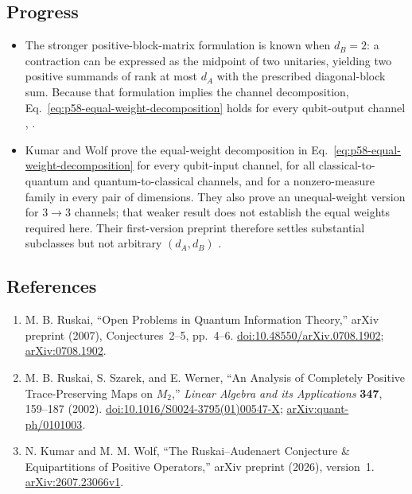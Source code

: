 \subsection*{Progress}

\begin{itemize}
  \item The stronger positive-block-matrix formulation is known when
  $d_B=2$: a contraction can be expressed as the midpoint of two unitaries,
  yielding two positive summands of rank at most $d_A$ with the prescribed
  diagonal-block sum.  Because that formulation implies the channel
  decomposition, Eq.~\eqref{eq:p58-equal-weight-decomposition} holds for
  every qubit-output channel
  ,
  .

  \item Kumar and Wolf prove the equal-weight decomposition in
  Eq.~\eqref{eq:p58-equal-weight-decomposition} for every qubit-input
  channel, for all classical-to-quantum and quantum-to-classical channels,
  and for a nonzero-measure family in every pair of dimensions.  They also
  prove an unequal-weight version for $3\to3$ channels; that weaker result
  does not establish the equal weights required here.  Their first-version
  preprint therefore settles substantial subclasses but not arbitrary
  $(d_A,d_B)$ .
\end{itemize}

\subsection*{References}

\begin{enumerate}[label={},leftmargin=4.8em,labelsep=0.5em]
  \footnotesize
  \item[\textup{[Rus07]}]\label{ref:p58-ruskai}
  M. B. Ruskai, ``Open Problems in Quantum Information Theory,''
  arXiv preprint (2007), Conjectures~2--5, pp.~4--6.
  \newline
  \href{https://doi.org/10.48550/arXiv.0708.1902}%
       {doi:10.48550/arXiv.0708.1902};
  \href{https://arxiv.org/abs/0708.1902}{arXiv:0708.1902}.

  \item[\textup{[RSW02]}]\label{ref:p58-ruskai-szarek-werner}
  M. B. Ruskai, S. Szarek, and E. Werner,
  ``An Analysis of Completely Positive Trace-Preserving Maps on $M_2$,''
  \emph{Linear Algebra and its Applications} \textbf{347}, 159--187
  (2002).
  \href{https://doi.org/10.1016/S0024-3795(01)00547-X}%
       {doi:10.1016/S0024-3795(01)00547-X};
  \href{https://arxiv.org/abs/quant-ph/0101003}%
       {arXiv:quant-ph/0101003}.

  \item[\textup{[KW26]}]\label{ref:p58-kumar-wolf}
  N. Kumar and M. M. Wolf,
  ``The Ruskai--Audenaert Conjecture \& Equipartitions of Positive
  Operators,'' arXiv preprint (2026), version~1.
  \href{https://arxiv.org/abs/2607.23066v1}{arXiv:2607.23066v1}.
\end{enumerate}

